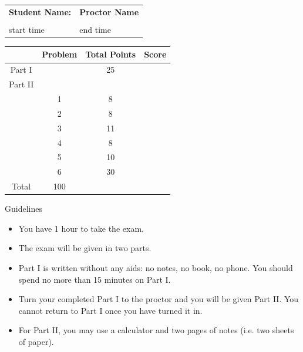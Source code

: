 \documentclass[11pt]{article}
\begin{document}
\thispagestyle{fancy}

\vspace{1in}
\begin{tabular}{ll}
\textbf{Student Name:}\hspace{1.5in}& \textbf{Proctor Name}\\
&\\
start time \hspace{1.5in} & end time\\
\end{tabular}

\vspace{1in}

{
\renewcommand{\baselinestretch}{1.8}
\setlength{\tabcolsep}{.2in}
\normalsize
\begin{center}
\begin{tabular}{|c|c|c|c|}
\hline
&Problem&Total Points&\parbox{.8in}{\hfil Score\hfil}\\
\hline
Part I&&25&\\
\hline
Part II &&&\\
\hline
&1&8&\\
\hline
&2&8&\\
\hline
&3&11&\\
\hline
&4&8&\\
\hline
&5&10&\\
\hline
&6&30&\\
\hline
\hline
Total&100&&\\
\hline
\end{tabular}

\end{center}
}

\vspace{1in} 

Guidelines
\begin{itemize}
\item You have 1 hour to take the exam.
\item The exam will be given in two parts.
\item Part I is written without any aids: no notes, no book, no phone. You should spend no more than 15 minutes on Part I. 
\item Turn your completed Part I to the proctor and you will be given Part II. You cannot return to Part I once you have turned it in.
\item For Part II, you may use a calculator and two pages of notes (i.e. two sheets of paper).
\end{itemize}

\newpage
\vspace*{-0.3in}
\end{document}

